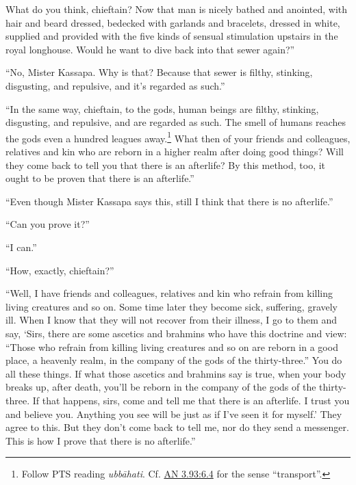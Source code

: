 \documentclass[12pt,openany]{book}%
\begin{document}
What do you think, chieftain? Now that man is nicely bathed and anointed, with hair and beard dressed, bedecked with garlands and bracelets, dressed in white, supplied and provided with the five kinds of sensual stimulation upstairs in the royal longhouse. Would he want to dive back into that sewer again?” 

“No, Mister Kassapa. Why is that? Because that sewer is filthy, stinking, disgusting, and repulsive, and it’s regarded as such.” 

“In the same way, chieftain, to the gods, human beings are filthy, stinking, disgusting, and repulsive, and are regarded as such. The smell of humans reaches the gods even a hundred leagues away.\footnote{Follow PTS reading \textit{\textsanskrit{ubbāhati}}. Cf. \href{https://suttacentral.net/an3.93/en/sujato\#6.4}{AN 3.93:6.4} for the sense “transport”. } What then of your friends and colleagues, relatives and kin who are reborn in a higher realm after doing good things? Will they come back to tell you that there is an afterlife? By this method, too, it ought to be proven that there is an afterlife.” 

“Even though Mister Kassapa says this, still I think that there is no afterlife.” 

“Can you prove it?” 

“I can.” 

“How, exactly, chieftain?” 

“Well, I have friends and colleagues, relatives and kin who refrain from killing living creatures and so on. Some time later they become sick, suffering, gravely ill. When I know that they will not recover from their illness, I go to them and say, ‘Sirs, there are some ascetics and brahmins who have this doctrine and view: “Those who refrain from killing living creatures and so on are reborn in a good place, a heavenly realm, in the company of the gods of the thirty-three.” You do all these things. If what those ascetics and brahmins say is true, when your body breaks up, after death, you’ll be reborn in the company of the gods of the thirty-three. If that happens, sirs, come and tell me that there is an afterlife. I trust you and believe you. Anything you see will be just as if I’ve seen it for myself.’ They agree to this. But they don’t come back to tell me, nor do they send a messenger. This is how I prove that there is no afterlife.” 
\end{document}

